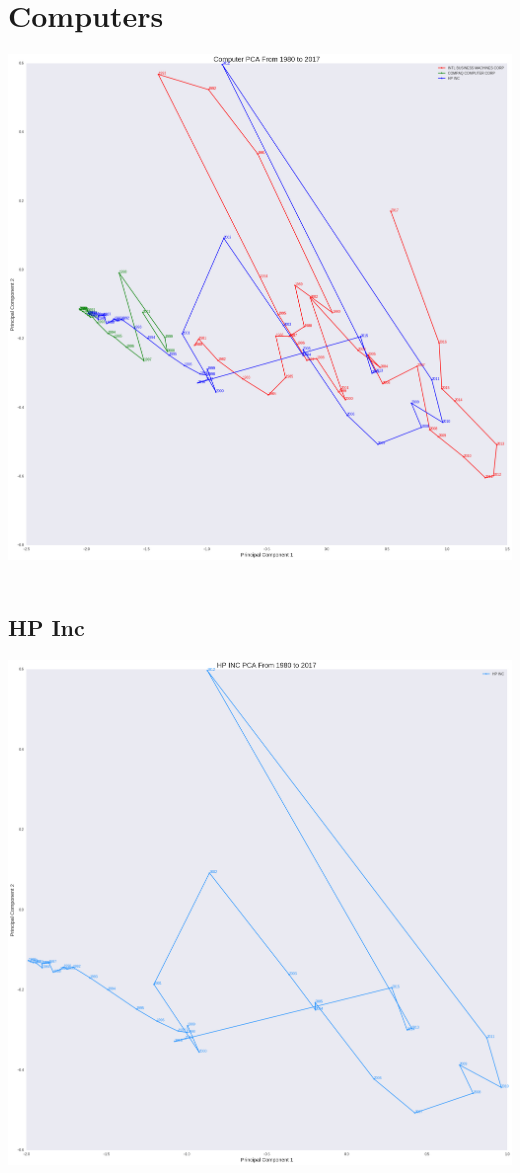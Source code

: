 \section{Computers}
\includegraphics[width=1\textwidth]{./Computers}\\[0.1in] \\
\subsection{HP Inc}
\includegraphics[width=1\textwidth]{./HP}\\[0.1in] \\
